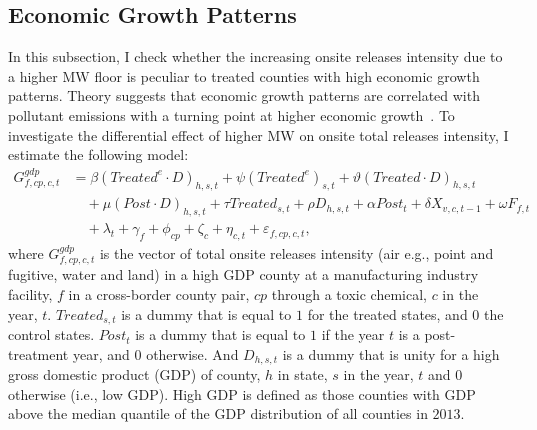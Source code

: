 \documentclass[12pt, english]{article}
\begin{document}
    \subsection{Economic Growth Patterns}\label{subsec:economic-growth-patterns}
    In this subsection, I check whether the increasing onsite releases intensity due to a higher MW floor is peculiar to treated counties with high economic growth patterns. Theory suggests that economic growth patterns are correlated with pollutant emissions with a turning point at higher economic growth~\parencite{grossman1995economic, shapiro2018pollution}. To investigate the differential effect of higher MW on onsite total releases intensity, I estimate the following model:
    \begin{align}
        G_{f,cp,c,t}^{gdp} &= \beta (Treated^{e} \cdot D)_{h,s,t} + \psi (Treated^{e})_{s,t} + \vartheta (Treated \cdot D)_{h,s,t} \nonumber \\
        &\quad + \mu (Post \cdot D)_{h,s,t} + \tau Treated_{s,t} + \rho D_{h,s,t} + \alpha Post_{t} + \delta X_{v,c,t-1} + \omega F_{f,t} \nonumber \\
        &\quad + \lambda_{t} + \gamma_{f} + \phi_{cp} + \zeta_{c} + \eta_{c,t} + \varepsilon_{f,cp,c,t},\label{eq:heterogeneous-onsite-releases-intensity-gdp}
    \end{align}
    where $G_{f,cp,c,t}^{gdp}$ is the vector of total onsite releases intensity (air e.g., point and fugitive, water and land) in a high GDP county at a manufacturing industry facility, $f$  in a cross-border county pair, $cp$ through a toxic chemical, $c$ in the year, $t$. $Treated_{s,t}$ is a dummy that is equal to $1$ for the treated states, and $0$ the control states. $Post_{t}$ is a dummy that is equal to $1$ if the year $t$ is a post-treatment year, and $0$ otherwise. And $D_{h,s,t}$ is a dummy that is unity for a high gross domestic product (GDP) of county, $h$ in state, $s$ in the year, $t$ and $0$ otherwise (i.e., low GDP). High GDP is defined as those counties with GDP above the median quantile of the GDP distribution of all counties in $2013$.
    
\end{document}
